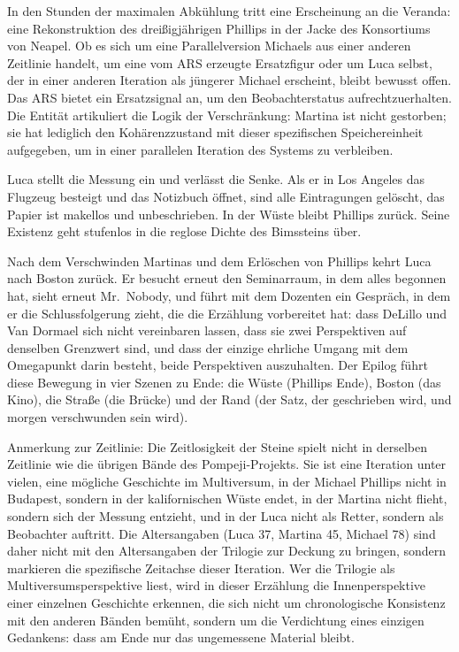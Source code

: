 \documentclass[
  ngerman,
]{article}
\begin{document}
In den Stunden der maximalen Abkühlung tritt eine Erscheinung an die
Veranda: eine Rekonstruktion des dreißigjährigen Phillips in der Jacke
des Konsortiums von Neapel. Ob es sich um eine Parallelversion Michaels
aus einer anderen Zeitlinie handelt, um eine vom ARS erzeugte
Ersatzfigur oder um Luca selbst, der in einer anderen Iteration als
jüngerer Michael erscheint, bleibt bewusst offen. Das ARS bietet ein
Ersatzsignal an, um den Beobachterstatus aufrechtzuerhalten. Die Entität
artikuliert die Logik der Verschränkung: Martina ist nicht gestorben;
sie hat lediglich den Kohärenzzustand mit dieser spezifischen
Speichereinheit aufgegeben, um in einer parallelen Iteration des Systems
zu verbleiben.

Luca stellt die Messung ein und verlässt die Senke. Als er in Los
Angeles das Flugzeug besteigt und das Notizbuch öffnet, sind alle
Eintragungen gelöscht, das Papier ist makellos und unbeschrieben. In der
Wüste bleibt Phillips zurück. Seine Existenz geht stufenlos in die
reglose Dichte des Bimssteins über.

Nach dem Verschwinden Martinas und dem Erlöschen von Phillips kehrt Luca
nach Boston zurück. Er besucht erneut den Seminarraum, in dem alles
begonnen hat, sieht erneut Mr.~Nobody, und führt mit dem Dozenten ein
Gespräch, in dem er die Schlussfolgerung zieht, die die Erzählung
vorbereitet hat: dass DeLillo und Van Dormael sich nicht vereinbaren
lassen, dass sie zwei Perspektiven auf denselben Grenzwert sind, und
dass der einzige ehrliche Umgang mit dem Omegapunkt darin besteht, beide
Perspektiven auszuhalten. Der Epilog führt diese Bewegung in vier Szenen
zu Ende: die Wüste (Phillips\textquotesingle{} Ende), Boston (das Kino),
die Straße (die Brücke) und der Rand (der Satz, der geschrieben wird,
und morgen verschwunden sein wird).

Anmerkung zur Zeitlinie: Die Zeitlosigkeit der Steine spielt nicht in
derselben Zeitlinie wie die übrigen Bände des Pompeji-Projekts. Sie ist
eine Iteration unter vielen, eine mögliche Geschichte im Multiversum, in
der Michael Phillips nicht in Budapest, sondern in der kalifornischen
Wüste endet, in der Martina nicht flieht, sondern sich der Messung
entzieht, und in der Luca nicht als Retter, sondern als Beobachter
auftritt. Die Altersangaben (Luca 37, Martina 45, Michael 78) sind daher
nicht mit den Altersangaben der Trilogie zur Deckung zu bringen, sondern
markieren die spezifische Zeitachse dieser Iteration. Wer die Trilogie
als Multiversumsperspektive liest, wird in dieser Erzählung die
Innenperspektive einer einzelnen Geschichte erkennen, die sich nicht um
chronologische Konsistenz mit den anderen Bänden bemüht, sondern um die
Verdichtung eines einzigen Gedankens: dass am Ende nur das ungemessene
Material bleibt.
\end{document}
